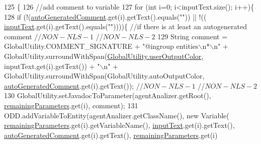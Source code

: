 \begin{DoxyCode}
125                                     \{ 
126         \textcolor{comment}{//add comment to variable}
127         \textcolor{keywordflow}{for} (\textcolor{keywordtype}{int} i=0; i<inputText.size(); i++)\{
128             \textcolor{keywordflow}{if} (!(\hyperlink{classit_1_1isislab_1_1masonassisteddocumentation_1_1mason_1_1wizards_1_1_f___agent_variables_page_a5256a71ed3e45356ac900afc1b75c1f2}{autoGeneratedComment}.get(i).getText().equals(\textcolor{stringliteral}{""})) || !((
      \hyperlink{classit_1_1isislab_1_1masonassisteddocumentation_1_1mason_1_1wizards_1_1_f___agent_variables_page_a4bec9c841bd5ecadb3a8780469cb0f3a}{inputText}.get(i).getText().equals(\textcolor{stringliteral}{""}))))\{  \textcolor{comment}{//if there is at least an autogenerated comment
       //$NON-NLS-1$ //$NON-NLS-2$}
129                 String comment = GlobalUtility.COMMENT\_SIGNATURE + \textcolor{stringliteral}{"@ingroup entities\(\backslash\)n*\(\backslash\)n"} + 
      GlobalUtility.surroundWithSpan(\hyperlink{classit_1_1isislab_1_1masonassisteddocumentation_1_1mason_1_1analizer_1_1_global_utility_a0fcb324ae33eb93bd5b9177e342ecc82}{GlobalUtility.userOutputColor}, inputText.get(i).getText()) + \textcolor{stringliteral}{
      "\(\backslash\)n"} + GlobalUtility.surroundWithSpan(GlobalUtility.autoOutputColor, 
      \hyperlink{classit_1_1isislab_1_1masonassisteddocumentation_1_1mason_1_1wizards_1_1_f___agent_variables_page_a5256a71ed3e45356ac900afc1b75c1f2}{autoGeneratedComment}.get(i).getText()); \textcolor{comment}{//$NON-NLS-1$ //$NON-NLS-2$}
130                 GlobalUtility.setJavadocToParameter(agentAnalizer.getRoot(), 
      \hyperlink{classit_1_1isislab_1_1masonassisteddocumentation_1_1mason_1_1wizards_1_1_f___agent_variables_page_a84c4e7c9e38a660e5befa94f5cac893f}{remainingParameters}.get(i), comment);
131                 ODD.addVariableToEntity(agentAnalizer.getClassName(), \textcolor{keyword}{new} Variable(
      \hyperlink{classit_1_1isislab_1_1masonassisteddocumentation_1_1mason_1_1wizards_1_1_f___agent_variables_page_a84c4e7c9e38a660e5befa94f5cac893f}{remainingParameters}.get(i).getVariableName(), \hyperlink{classit_1_1isislab_1_1masonassisteddocumentation_1_1mason_1_1wizards_1_1_f___agent_variables_page_a4bec9c841bd5ecadb3a8780469cb0f3a}{inputText}.get(i).getText(), 
      \hyperlink{classit_1_1isislab_1_1masonassisteddocumentation_1_1mason_1_1wizards_1_1_f___agent_variables_page_a5256a71ed3e45356ac900afc1b75c1f2}{autoGeneratedComment}.get(i).getText(), \hyperlink{classit_1_1isislab_1_1masonassisteddocumentation_1_1mason_1_1wizards_1_1_f___agent_variables_page_a84c4e7c9e38a660e5befa94f5cac893f}{remainingParameters}.get(i)

\end{DoxyCode}

